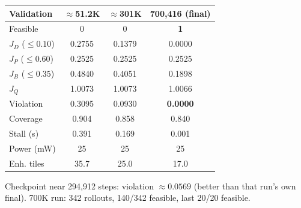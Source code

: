 \documentclass[aspectratio=169]{beamer}
\begin{document}
\begin{frame}
\begin{center}
{\scriptsize
\setlength{\tabcolsep}{4pt}
\begin{tabular}{lccc}
\toprule
Validation & $\approx$51.2K & $\approx$301K & 700{,}416 (final) \\
\midrule
Feasible & 0 & 0 & \textbf{1} \\
$J_D$ ($\le0.10$) & 0.2755 & 0.1379 & 0.0000 \\
$J_P$ ($\le0.60$) & 0.2525 & 0.2525 & 0.2525 \\
$J_B$ ($\le0.35$) & 0.4840 & 0.4051 & 0.1898 \\
$J_Q$ & 1.0073 & 1.0073 & 1.0066 \\
Violation & 0.3095 & 0.0930 & \textbf{0.0000} \\
Coverage & 0.904 & 0.858 & 0.840 \\
Stall (s) & 0.391 & 0.169 & 0.001 \\
Power (mW) & 25 & 25 & 25 \\
Enh. tiles & 35.7 & 25.0 & 17.0 \\
\bottomrule
\end{tabular}}
\end{center}
\vspace{6pt}
\footnotesize Checkpoint near 294{,}912 steps: violation $\approx0.0569$ (better than that run's own final). 700K run: 342 rollouts, 140/342 feasible, last 20/20 feasible.
\end{frame}
\end{document}
